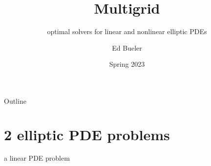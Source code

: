 \documentclass[10pt,
               svgnames,
               hyperref={colorlinks,citecolor=DeepPink4,linkcolor=FireBrick,urlcolor=Maroon},
               usepdftitle=false]{beamer}
\title{Multigrid}
\subtitle{optimal solvers for linear and nonlinear elliptic PDEs}
\author{Ed Bueler}
\institute[]{UAF Math 692 Scalable Seminar}
\date{Spring 2023}
\begin{document}
\beamertemplatenavigationsymbolsempty

\begin{frame}
  \maketitle
\end{frame}

\begin{frame}{Outline}
  \tableofcontents[hideallsubsections]
\end{frame}


\section{2 elliptic PDE problems}

\begin{frame}{a linear PDE problem}


\end{frame}
\end{document}
